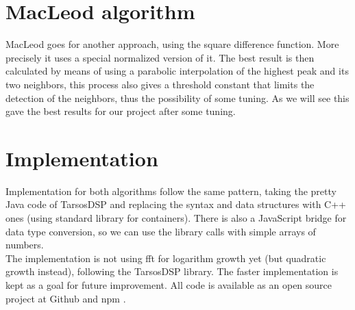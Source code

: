 \section{MacLeod algorithm}
MacLeod \cite{MacLeodArticle} goes for another approach, using the square difference
function. More precisely it uses a special normalized version of it. The best result
is then calculated by means of using a parabolic interpolation of the highest
peak and its two neighbors, this process also gives a threshold constant that limits
the detection of the neighbors, thus the possibility of some tuning. As we will
see this gave the best results for our project after some tuning.

\section{Implementation}
\label{pitch-detection-implementation}
Implementation for both algorithms follow the same pattern, taking the pretty
Java code of TarsosDSP \cite{TarsosDSP} and replacing the syntax and data structures
with C++ ones (using standard library for containers). There is also a JavaScript bridge
for data type conversion, so we can use the library calls with simple arrays of numbers.\\
The implementation is not using fft for logarithm growth yet (but quadratic growth
instead), following the TarsosDSP library. The faster implementation is kept as
a goal for future improvement. All code is available as an open source project at
Github and npm \cite{node-pitchfinder}.

